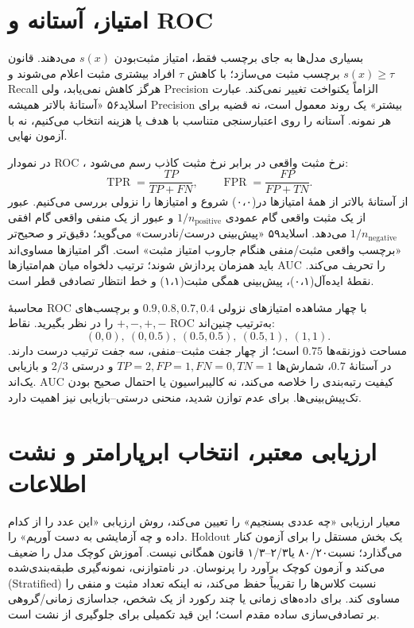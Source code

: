 \section{امتیاز، آستانه و ROC}

بسیاری مدل‌ها به جای برچسب فقط، امتیاز مثبت‌بودن $s(x)$ می‌دهند. قانون $s(x)\ge\tau$ برچسب مثبت می‌سازد؛ با کاهش $\tau$ افراد بیشتری مثبت اعلام می‌شوند و Recall هرگز کاهش نمی‌یابد، ولی Precision الزاماً یکنواخت تغییر نمی‌کند. عبارت اسلاید۵۶ «آستانهٔ بالاتر همیشه Precision بیشتر» یک روند معمول است، نه قضیه برای هر نمونه. آستانه را روی اعتبارسنجی متناسب با هدف یا هزینه انتخاب می‌کنیم، نه با آزمون نهایی.

در نمودار ROC ، نرخ مثبت واقعی در برابر نرخ مثبت کاذب رسم می‌شود:\[\operatorname{TPR}=\frac{TP}{TP+FN},\qquad\operatorname{FPR}=\frac{FP}{FP+TN}.\] از آستانهٔ بالاتر از همهٔ امتیازها در(۰،۰) شروع و امتیازها را نزولی بررسی می‌کنیم. عبور از یک مثبت واقعی گام عمودی $1/n_{\mathrm{positive}}$ و عبور از یک منفی واقعی گام افقی $1/n_{\mathrm{negative}}$ می‌دهد. اسلاید۵۹ «پیش‌بینی درست/نادرست» می‌گوید؛ دقیق‌تر و صحیح‌تر «برچسب واقعی مثبت/منفی هنگام جاروب امتیاز مثبت» است. اگر امتیازها مساوی‌اند باید همزمان پردازش شوند؛ ترتیب دلخواه میان هم‌امتیازها AUC را تحریف می‌کند. نقطهٔ ایده‌آل(۰،۱)، پیش‌بینی همگی مثبت(۱،۱) و خط انتظار تصادفی قطر است.

\begin{example}{محاسبهٔ ROC با چهار مشاهده}
امتیازهای نزولی $0.9,0.8,0.7,0.4$ و برچسب‌های $+,-,+,-$ را در نظر بگیرید. نقاط ROC به‌ترتیب چنین‌اند:
\[(0,0),\ (0,0.5),\ (0.5,0.5),\ (0.5,1),\ (1,1).\]
مساحت ذوزنقه‌ها $0.75$ است؛ از چهار جفت مثبت–منفی، سه جفت ترتیب درست دارند. در آستانهٔ $0.7$، شمارش‌ها $TP=2,FP=1,FN=0,TN=1$ و درستی $2/3$ و بازیابی یک‌اند. AUC کیفیت رتبه‌بندی را خلاصه می‌کند، نه کالیبراسیون یا احتمال صحیح بودن تک‌پیش‌بینی‌ها. برای عدم توازن شدید، منحنی درستی–بازیابی نیز اهمیت دارد.
\end{example}



\section{ارزیابی معتبر، انتخاب ابرپارامتر و نشت اطلاعات}

معیار ارزیابی «چه عددی بسنجیم» را تعیین می‌کند، روش ارزیابی «این عدد را از کدام داده و چه آزمایشی به دست آوریم» را. Holdout یک بخش مستقل را برای آزمون کنار می‌گذارد؛ نسبت۸۰/۲۰ یا۲/۳--۱/۳ قانون همگانی نیست. آموزش کوچک مدل را ضعیف می‌کند و آزمون کوچک برآورد را پرنوسان. در نامتوازنی، نمونه‌گیری طبقه‌بندی‌شده (Stratified) نسبت کلاس‌ها را تقریباً حفظ می‌کند، نه اینکه تعداد مثبت و منفی را مساوی کند. برای داده‌های زمانی یا چند رکورد از یک شخص، جداسازی زمانی/گروهی بر تصادفی‌سازی ساده مقدم است؛ این قید تکمیلی برای جلوگیری از نشت است.


